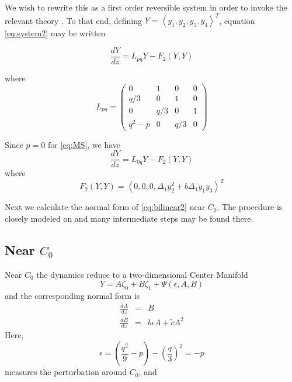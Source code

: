 We wish to rewrite this as a first order reversible system in order to invoke the relevant theory \cite{IA}. 
To that end, defining  $Y=\left<y_1,y_2,y_3,y_4\right>^T$, equation \eqref{eq:system2} may be written 

\begin{equation}\label{eq:bilinear2}
\frac{ dY }{ dz } = L_{pq} Y - F_2(Y,Y)
\end{equation}

where 
\begin{equation}
L_{pq} = \left( 
\begin{array}{cccc}
0&1&0&0\\
q/3&0&1&0\\
0&q/3&0&1\\
q^2 - p &0&q/3&0 \end{array} \right) \end{equation}

Since $p=0$ for \eqref{eq:MS}, we have 
\begin{equation} \label{eq:bilinear2}
 \frac{ dY }{ dz } = L_{0q} Y - F_2(Y,Y) 
\end{equation}
where 
\begin{equation}\label{eq:nonlinear2}
F_2(Y,Y) = \left<0,0,0,\Delta_1 y_2^2 + b \Delta_1 y_1 y_3 \right>^T
\end{equation}

Next we calculate the normal form of \eqref{eq:bilinear2} near $C_0$. The procedure is
closely modeled on \cite{IA} and many intermediate steps may be found there. 

\subsection{ Near $C_0$ }
Near $C_0$ the dynamics reduce to a two-dimensional Center Manifold
\begin{equation}\label{eq:c0cm2}
 Y = A \zeta_0 + B \zeta_1 + \Psi(\epsilon,A,B)
\end{equation}
and the corresponding normal form is
\begin{subequations}\label{eq:c0nf2}
\begin{eqnarray}
\frac{dA}{dz} &=& B \label{eq:c0nf2a} \\
\frac{dB}{dz} &=& b \epsilon A + \tilde{c} A^2 \label{eq:c0nf2b}
\end{eqnarray}
\end{subequations}
Here,
\begin{equation}
\epsilon = \left( \frac{q^2}{9} - p\right) - \left(\frac{q}{3}\right)^2 = - p 
\end{equation}
measures the perturbation around $C_0$, and

